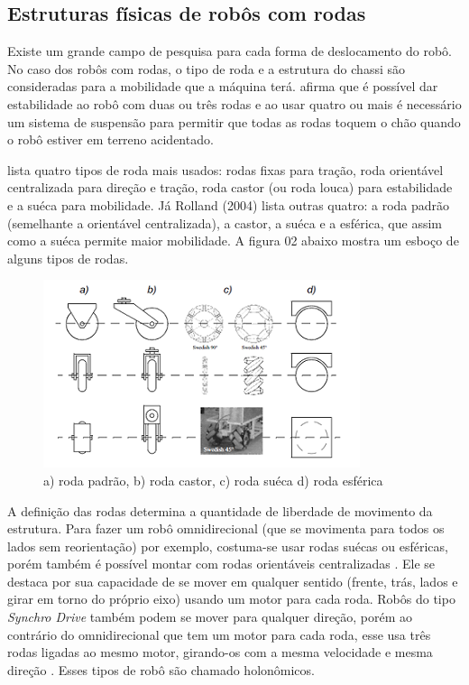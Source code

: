 \subsection{Estruturas físicas de robôs com rodas}

Existe um grande campo de pesquisa para cada forma de deslocamento do robô. No caso dos robôs com rodas, o tipo de roda e a estrutura do chassi são consideradas para a mobilidade que a máquina terá. \cite{Siegwart2004} afirma que é possível dar estabilidade ao robô com duas ou três rodas e ao usar quatro ou mais é necessário um sistema de suspensão para permitir que todas as rodas toquem o chão quando o robô estiver em terreno acidentado.

\cite{Secchi2008} lista quatro tipos de roda mais usados: rodas fixas para tração, roda orientável centralizada para direção e tração, roda castor (ou roda louca) para estabilidade e a suéca para mobilidade. Já Rolland (2004) lista outras quatro: a roda padrão (semelhante a orientável centralizada), a castor, a suéca e a esférica, que assim como a suéca permite maior mobilidade. A figura 02 abaixo mostra um esboço de alguns tipos de rodas.

\begin{figure}[h]
	\centering
	\label{fig02}
		\includegraphics[keepaspectratio=true,scale=1]{figuras/1rodas.png}
	\caption{a) roda padrão, b) roda castor, c) roda suéca d) roda esférica \cite{Siegwart2004}}
\end{figure}

A definição das rodas determina a quantidade de liberdade de movimento da estrutura. Para fazer um robô omnidirecional (que se movimenta para todos os lados sem reorientação) por exemplo, costuma-se usar rodas suécas ou esféricas, porém também é possível montar com rodas orientáveis centralizadas \cite{Secchi2008}. Ele se destaca por sua capacidade de se mover em qualquer sentido (frente, trás, lados e girar em torno do próprio eixo) usando um motor para cada roda. Robôs do tipo \textit{Synchro Drive} também podem se mover para qualquer direção, porém ao contrário do omnidirecional que tem um motor para cada roda, esse usa três rodas ligadas ao mesmo motor, girando-os com a mesma velocidade e mesma direção \cite{Borenstein1996}. Esses tipos de robô são chamado holonômicos.

